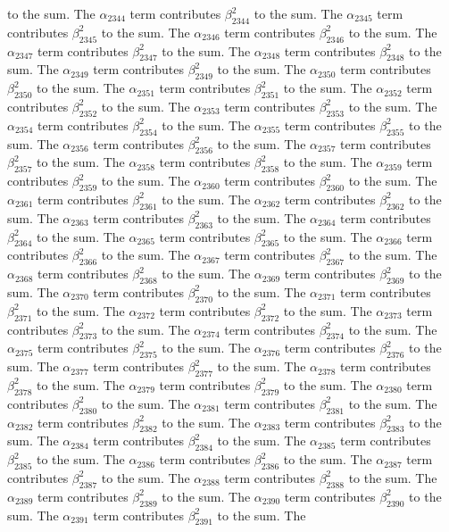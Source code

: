 \begin{lemma}
to the sum. The $\alpha_{2344}$ term contributes $\beta_{2344}^{2}$ to the sum. The $\alpha_{2345}$ term contributes $\beta_{2345}^{2}$ to the sum. The $\alpha_{2346}$ term contributes $\beta_{2346}^{2}$ to the sum. The $\alpha_{2347}$ term contributes $\beta_{2347}^{2}$ to the sum. The $\alpha_{2348}$ term contributes $\beta_{2348}^{2}$ to the sum. The $\alpha_{2349}$ term contributes $\beta_{2349}^{2}$ to the sum. The $\alpha_{2350}$ term contributes $\beta_{2350}^{2}$ to the sum. The $\alpha_{2351}$ term contributes $\beta_{2351}^{2}$ to the sum. The $\alpha_{2352}$ term contributes $\beta_{2352}^{2}$ to the sum. The $\alpha_{2353}$ term contributes $\beta_{2353}^{2}$ to the sum. The $\alpha_{2354}$ term contributes $\beta_{2354}^{2}$ to the sum. The $\alpha_{2355}$ term contributes $\beta_{2355}^{2}$ to the sum. The $\alpha_{2356}$ term contributes $\beta_{2356}^{2}$ to the sum. The $\alpha_{2357}$ term contributes $\beta_{2357}^{2}$ to the sum. The $\alpha_{2358}$ term contributes $\beta_{2358}^{2}$ to the sum. The $\alpha_{2359}$ term contributes $\beta_{2359}^{2}$ to the sum. The $\alpha_{2360}$ term contributes $\beta_{2360}^{2}$ to the sum. The $\alpha_{2361}$ term contributes $\beta_{2361}^{2}$ to the sum. The $\alpha_{2362}$ term contributes $\beta_{2362}^{2}$ to the sum. The $\alpha_{2363}$ term contributes $\beta_{2363}^{2}$ to the sum. The $\alpha_{2364}$ term contributes $\beta_{2364}^{2}$ to the sum. The $\alpha_{2365}$ term contributes $\beta_{2365}^{2}$ to the sum. The $\alpha_{2366}$ term contributes $\beta_{2366}^{2}$ to the sum. The $\alpha_{2367}$ term contributes $\beta_{2367}^{2}$ to the sum. The $\alpha_{2368}$ term contributes $\beta_{2368}^{2}$ to the sum. The $\alpha_{2369}$ term contributes $\beta_{2369}^{2}$ to the sum. The $\alpha_{2370}$ term contributes $\beta_{2370}^{2}$ to the sum. The $\alpha_{2371}$ term contributes $\beta_{2371}^{2}$ to the sum. The $\alpha_{2372}$ term contributes $\beta_{2372}^{2}$ to the sum. The $\alpha_{2373}$ term contributes $\beta_{2373}^{2}$ to the sum. The $\alpha_{2374}$ term contributes $\beta_{2374}^{2}$ to the sum. The $\alpha_{2375}$ term contributes $\beta_{2375}^{2}$ to the sum. The $\alpha_{2376}$ term contributes $\beta_{2376}^{2}$ to the sum. The $\alpha_{2377}$ term contributes $\beta_{2377}^{2}$ to the sum. The $\alpha_{2378}$ term contributes $\beta_{2378}^{2}$ to the sum. The $\alpha_{2379}$ term contributes $\beta_{2379}^{2}$ to the sum. The $\alpha_{2380}$ term contributes $\beta_{2380}^{2}$ to the sum. The $\alpha_{2381}$ term contributes $\beta_{2381}^{2}$ to the sum. The $\alpha_{2382}$ term contributes $\beta_{2382}^{2}$ to the sum. The $\alpha_{2383}$ term contributes $\beta_{2383}^{2}$ to the sum. The $\alpha_{2384}$ term contributes $\beta_{2384}^{2}$ to the sum. The $\alpha_{2385}$ term contributes $\beta_{2385}^{2}$ to the sum. The $\alpha_{2386}$ term contributes $\beta_{2386}^{2}$ to the sum. The $\alpha_{2387}$ term contributes $\beta_{2387}^{2}$ to the sum. The $\alpha_{2388}$ term contributes $\beta_{2388}^{2}$ to the sum. The $\alpha_{2389}$ term contributes $\beta_{2389}^{2}$ to the sum. The $\alpha_{2390}$ term contributes $\beta_{2390}^{2}$ to the sum. The $\alpha_{2391}$ term contributes $\beta_{2391}^{2}$ to the sum. The 
\end{lemma}
